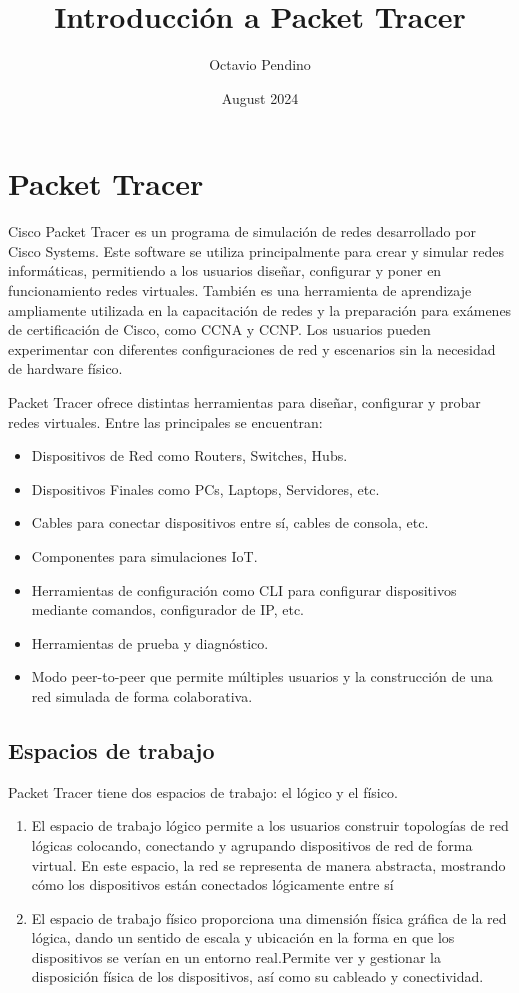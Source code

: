 \documentclass{article}
\title{Introducción a Packet Tracer}
\author{Octavio Pendino}
\date{August 2024}
\begin{document}
\maketitle

\section{Packet Tracer}
Cisco Packet Tracer es un programa de simulación de redes desarrollado por Cisco Systems. Este software se utiliza principalmente para crear y simular redes informáticas, permitiendo a los usuarios diseñar, configurar y poner en funcionamiento redes virtuales. También es una herramienta de aprendizaje ampliamente utilizada en la capacitación de redes y la preparación para exámenes de certificación de Cisco, como CCNA y CCNP. Los usuarios pueden experimentar con diferentes configuraciones de red y escenarios sin la necesidad de hardware físico.

    Packet Tracer ofrece distintas herramientas para diseñar, configurar y probar redes virtuales. Entre las principales se encuentran:
    \begin{itemize}
        \item Dispositivos de Red como Routers, Switches, Hubs.
        \item Dispositivos Finales como PCs, Laptops, Servidores, etc.
        \item Cables para conectar dispositivos entre sí, cables de consola, etc.
        \item Componentes para simulaciones IoT.
        \item Herramientas de configuración como CLI para configurar dispositivos mediante comandos, configurador de IP, etc.
        \item Herramientas de prueba y diagnóstico.
        \item Modo peer-to-peer que permite múltiples usuarios y la construcción de una red simulada de forma colaborativa.
    \end{itemize}

\subsection{Espacios de trabajo}
     Packet Tracer tiene dos espacios de trabajo: el lógico y el físico. 
     \begin{enumerate}
         \item El espacio de trabajo lógico permite a los usuarios construir topologías de red lógicas colocando, conectando y agrupando dispositivos de red de forma virtual. En este espacio, la red se representa de manera abstracta, mostrando cómo los dispositivos están conectados lógicamente entre sí
         \item El espacio de trabajo físico proporciona una dimensión física gráfica de la red lógica, dando un sentido de escala y ubicación en la forma en que los dispositivos se verían en un entorno real.Permite ver y gestionar la disposición física de los dispositivos, así como su cableado y conectividad. 
     \end{enumerate}
\end{document}
